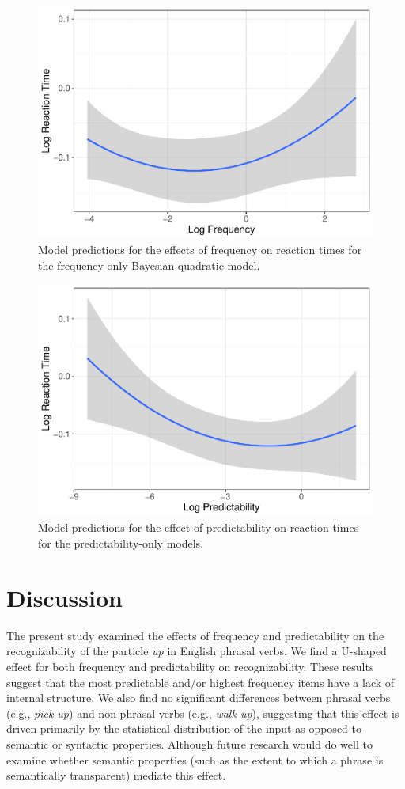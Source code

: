 \documentclass[
  man,floatsintext]{apa6}
\begin{document}
\begin{figure}

{\centering \includegraphics[width=0.6\linewidth]{write-up_files/figure-latex/FreqOnlyPlot-1} 

}

\caption{Model predictions for the effects of frequency on reaction times for the frequency-only Bayesian quadratic model.}\label{fig:FreqOnlyPlot}
\end{figure}

\begin{figure}

{\centering \includegraphics[width=0.6\linewidth]{write-up_files/figure-latex/PredicOnlyPlot-1} 

}

\caption{Model predictions for the effect of predictability on reaction times for the predictability-only models.}\label{fig:PredicOnlyPlot}
\end{figure}

\section{Discussion}\label{discussion}

The present study examined the effects of frequency and predictability on the recognizability of the particle \emph{up} in English phrasal verbs. We find a U-shaped effect for both frequency and predictability on recognizability. These results suggest that the most predictable and/or highest frequency items have a lack of internal structure. We also find no significant differences between phrasal verbs (e.g., \emph{pick up}) and non-phrasal verbs (e.g., \emph{walk up}), suggesting that this effect is driven primarily by the statistical distribution of the input as opposed to semantic or syntactic properties. Although future research would do well to examine whether semantic properties (such as the extent to which a phrase is semantically transparent) mediate this effect.
\end{document}
